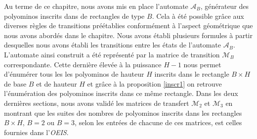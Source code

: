 Au terme de ce chapitre, nous avons mis en place l'automate $\mathcal{A}_{B}$, générateur des polyominos inscrits dans de rectangles de type $B$. Cela à été possible grâce  aux diverses règles de transitions préétablies conformément à l'aspect géométrique que nous avons abordés dans le chapitre. Nous avons établi  plusieurs formules  à partir desquelles nous avons établi les transitions entre les états de l'automate $\mathcal{A}_{B}$. L'automate ainsi construit a été représenté par la matrice de transition $\mathcal{M}_{B}$ correspondante. Cette dernière élevée à la puissance $H-1$ nous permet d'énumérer tous les les polyominos de hauteur $H$ inscrits dans le rectangle $B\times H$ de base $B$ et de hauteur $H$ et grâce à la proposition \ref{inscr1} on retrouve l'énumération des polyominos inscrits dans ce même rectangle. Dans les deux dernières sections, nous avons validé les matrices de transfert $\mathcal{M}_{2}$ et  $\mathcal{M}_{3}$ en montrant que les suites des nombres de polyominos inscrits dans les rectangles $B\times H$, $B=2$ ou $B=3$, selon les entrées de chacune de ces matrices, est celles fournies dans l'\emph{OEIS}.